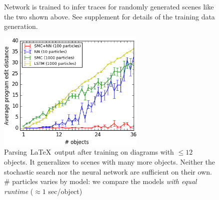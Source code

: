 \documentclass{article}
\begin{document}
\begin{figure}[H]\centering
  \begin{minipage}{6cm}
    \begin{minipage}[t]{3cm}\end{minipage}%
    \begin{minipage}[t]{3cm}\end{minipage}
    \caption{Network is trained to infer traces for randomly generated scenes like the two shown above. See supplement for details of the training data generation.}\label{trainingData}
  \end{minipage}\hfill%
  \begin{minipage}{7.5cm}\centering
    \includegraphics[width = 7cm]{figures/editDistance36.png}
      \caption{Parsing~\LaTeX~output after training on diagrams with $\leq 12$ objects. It generalizes to scenes with many more objects. Neither the stochastic search nor the neural network are sufficient on their own. \# particles varies by model: we compare the models \emph{with equal runtime} ($\approx 1$ sec/object)}\label{syntheticResults}
    \end{minipage}
  
  \end{figure}
\end{document}

